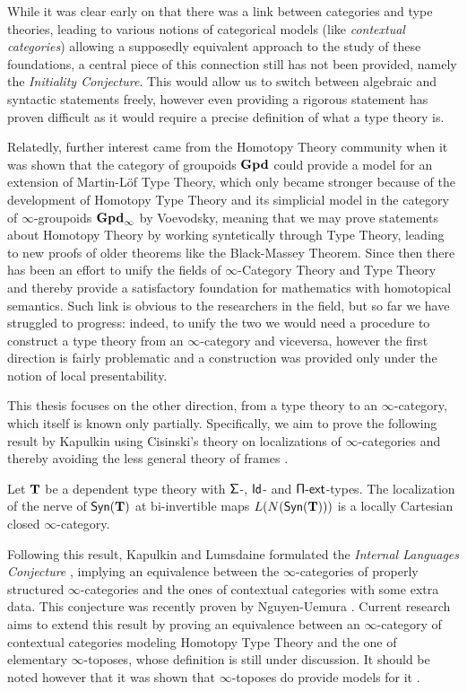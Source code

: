 \noindent
While it was clear early on that there was a link between categories and type
theories, leading to various notions of categorical models (like
\emph{contextual categories}) allowing a supposedly
equivalent approach to the study of these foundations, a central piece of this
connection still has not been provided, namely the \emph{Initiality Conjecture}.
This would allow us to switch between algebraic and syntactic statements freely,
however even providing a rigorous statement has proven difficult as it would
require a precise definition of what a type theory is.

\noindent
Relatedly, further interest came from the Homotopy Theory community when it was
shown that the category of groupoids $\operatorname{\mathbf{Gpd}}$ could provide a model for an
extension of Martin-L{\"o}f Type Theory, which only became stronger because of
the development of
Homotopy Type Theory and its simplicial model in the category of
$\infty$-groupoids $\operatorname{\mathbf{Gpd}_\infty}$ by
Voevodsky, meaning that we may prove statements about Homotopy Theory by working
syntetically through Type Theory, leading to new proofs of older theorems like
the Black-Massey Theorem. Since then there has been an effort to unify the
fields of $\infty$-Category Theory and Type Theory and thereby provide a
satisfactory foundation for mathematics with homotopical semantics. Such link is
obvious to the researchers in the field, but so far we have struggled to
progress: indeed, to unify the two we would need a procedure to construct a type
theory from an $\infty$-category and viceversa, however the first direction is
fairly problematic and a construction was provided only under the notion of
local presentability.

\noindent
This thesis focuses on the other direction, from a type theory to an
$\infty$-category, which itself is known only partially. Specifically, we aim to
prove the following result by Kapulkin \cite[Thm.\ 9.3.17]{Kap14} using
Cisinski's theory on localizations of $\infty$-categories \cite{Cis19} and
thereby avoiding the less general theory of frames \cite{Szu14,KS15}.

\begin{finalthm}
  Let $\operatorname{\mathbf{T}}$ be a dependent type theory with $\operatorname{\mathsf{\Sigma}}$-, $\operatorname{\mathsf{Id}}$- and
  $\operatorname{\mathsf{\Pi-ext}}$-types. The localization of the nerve of $\mathsf{Syn}(\mathbf{T})$ at bi-invertible
  maps $L(N(\mathsf{Syn}(\mathbf{T})))$ is a locally Cartesian closed $\infty$-category.
\end{finalthm}

\noindent
Following this result, Kapulkin and Lumsdaine formulated the \emph{Internal
Languages Conjecture} \cite[Conj.\ 3.7]{KL16}, implying an equivalence between
the $\infty$-categories of properly structured $\infty$-categories and the ones
of contextual categories with some extra data. This conjecture
was recently proven by Nguyen-Uemura \cite{NU22}. Current research aims to
extend this result by proving an equivalence between an $\infty$-category of
contextual categories modeling Homotopy Type Theory and the one of elementary
$\infty$-toposes, whose definition is still under discussion. It should be noted
however that it was shown that $\infty$-toposes do provide models for it
\cite{Shu19}.

